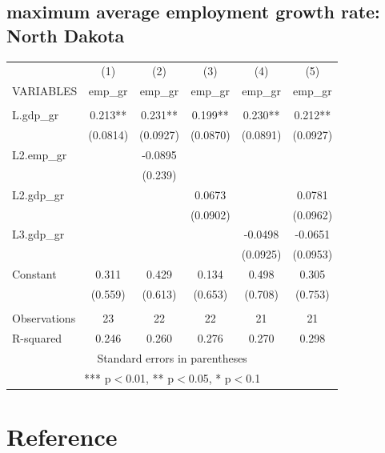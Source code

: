 \documentclass{article}
\begin{document}
\subsection{maximum average employment growth rate: North Dakota}
\begin{center}
\resizebox{9cm}{!}
{
\begin{tabular}{lccccc} \hline
        & (1) & (2) & (3) & (4) & (5) \\
       VARIABLES & emp\_gr & emp\_gr & emp\_gr & emp\_gr & emp\_gr \\ \hline
        &  &  &  &  &  \\
       L.gdp\_gr & 0.213** & 0.231** & 0.199** & 0.230** & 0.212** \\
        & (0.0814) & (0.0927) & (0.0870) & (0.0891) & (0.0927) \\
       L2.emp\_gr &  & -0.0895 &  &  &  \\
        &  & (0.239) &  &  &  \\
       L2.gdp\_gr &  &  & 0.0673 &  & 0.0781 \\
        &  &  & (0.0902) &  & (0.0962) \\
       L3.gdp\_gr &  &  &  & -0.0498 & -0.0651 \\
        &  &  &  & (0.0925) & (0.0953) \\
       Constant & 0.311 & 0.429 & 0.134 & 0.498 & 0.305 \\
        & (0.559) & (0.613) & (0.653) & (0.708) & (0.753) \\
        &  &  &  &  &  \\
       Observations & 23 & 22 & 22 & 21 & 21 \\
        R-squared & 0.246 & 0.260 & 0.276 & 0.270 & 0.298 \\ \hline
       \multicolumn{6}{c}{ Standard errors in parentheses} \\
       \multicolumn{6}{c}{ *** p$<$0.01, ** p$<$0.05, * p$<$0.1} \\
\end{tabular}
}
\end{center}



\newpage
\section{Reference}
\end{document}
